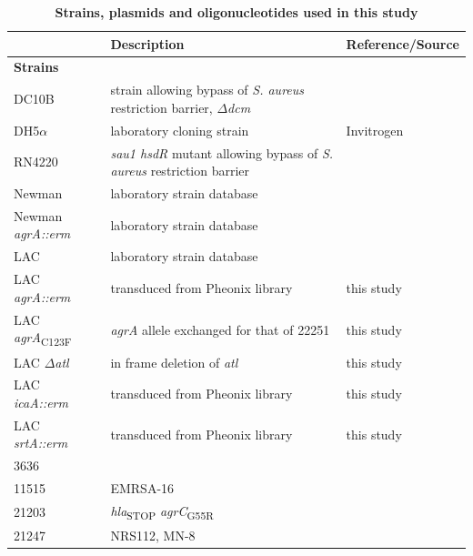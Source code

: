 \documentclass[10pt,letterpaper]{article}
\begin{document}
\begin{table}[!ht]
\begin{adjustwidth}{-2.25in}{0in} %
\centering
\caption{
{\bf Strains, plasmids and oligonucleotides used in this study}}
\begin{tabular}{|l|l|l|}
\hline
{ } & {\bf Description} & {\bf Reference/Source}\\ \hline
\multicolumn{3}{|l|}{\bf Strains}\\ \hline
DC10B & strain allowing bypass of \textit{S. aureus} restriction barrier, $\Delta$\textit{dcm} & \cite{monk_transforming_2012}\\ \hline
DH5$\alpha$ & laboratory cloning strain & Invitrogen\\ \hline
RN4220 & \textit{sau1 hsdR} mutant allowing bypass of \textit{S. aureus} restriction barrier & \cite{nair_whole-genome_2011}\\ \hline
Newman & laboratory strain database & \cite{wardenburg_surface_2007}\\ \hline
Newman \textit{agrA::erm} & laboratory strain database & \cite{wardenburg_surface_2007}\\ \hline
LAC & laboratory strain database & \cite{bubeck_wardenburg_poring_2007}\\ \hline
LAC \textit{agrA::erm} & transduced from Pheonix library & this study\\ \hline
LAC \textit{agrA}\textsubscript{C123F} & \textit{agrA} allele exchanged for that of 22251 & this study\\ \hline
LAC $\Delta$\textit{atl} & in frame deletion of \textit{atl} & this study\\ \hline
LAC \textit{icaA::erm} & transduced from Pheonix library & this study\\ \hline
LAC \textit{srtA::erm} & transduced from Pheonix library & this study\\ \hline
3636 &  & \cite{deleo_molecular_2011}\\ \hline
11515 & EMRSA-16 & \cite{deleo_molecular_2011}\\ \hline
21203 & \textit{hla}\textsubscript{STOP} \textit{agrC}\textsubscript{G55R} & \cite{deleo_molecular_2011}\\ \hline
21247 & NRS112, MN-8 & \cite{deleo_molecular_2011}\\ \hline

\end{tabular}
\end{adjustwidth}
\end{table}
\end{document}
